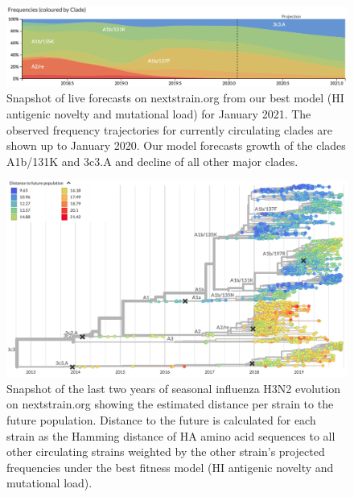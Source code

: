\begin{figure}[htb]
  \begin{center}
  \includegraphics[width=\textwidth]{figures/nextstrain-forecasts.png}
  \caption{
    Snapshot of live forecasts on nextstrain.org from our best model (HI antigenic novelty and mutational load) for January 2021.
    The observed frequency trajectories for currently circulating clades are shown up to January 2020.
    Our model forecasts growth of the clades A1b/131K and 3c3.A and decline of all other major clades.
  }
  \label{fig:nextstrain_forecasts}
  \end{center}
\end{figure}

\begin{figure}[htb]
  \begin{center}
  \includegraphics[width=\textwidth]{figures/nextstrain-weighted-distance-to-future-per-strain.png}
  \caption{
    Snapshot of the last two years of seasonal influenza H3N2 evolution on nextstrain.org showing the estimated distance per strain to the future population.
    Distance to the future is calculated for each strain as the Hamming distance of HA amino acid sequences to all other circulating strains weighted by the other strain's projected frequencies under the best fitness model (HI antigenic novelty and mutational load).
  }
  \label{fig:nextstrain_distance_to_future}
  \end{center}
\end{figure}

